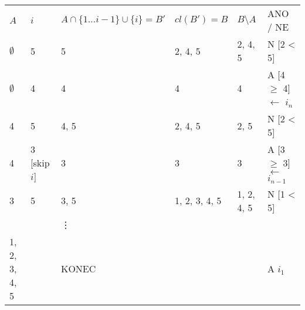 \begin{tabular}{l|l|l|l|l|p{3cm}}
    \multirow{2}{*}{$ A $} & \multirow{2}{*}{$ i $} & \multirow{2}{*}{$ A \cap \{1 \ldots i - 1\} \cup \{i\} = B' $ } & \multirow{2}{*}{$ cl(B') = B $ } & \multirow{2}{*}{$B \setminus A $  } & \multirow{2}{*}{ANO / NE }             \\
                           &                        &                                                                 &                                  &                                     &                                        \\ \hhline
    $\emptyset$            & 5                      & 5                                                               & 2, 4, 5                          & 2, 4, 5                             & N [2 < 5]                              \\
    $\emptyset$            & 4                      & 4                                                               & 4                                & 4                                   & A [4 $\geq$ 4] $\leftarrow$ $i_n$      \\
    4                      & 5                      & 4, 5                                                            & 2, 4, 5                          & 2, 5                                & N [2 < 5]                              \\
    4                      & 3 [skip $i$]           & 3                                                               & 3                                & 3                                   & A [3$\geq$ 3] $\leftarrow$ $i_{n - 1}$ \\
    3                      & 5                      & 3, 5                                                            & 1, 2, 3, 4, 5                    & 1, 2, 4, 5                          & N [1 < 5]                              \\
                           &                        & \vdots                                                          &                                  &                                     &                                        \\
    1, 2, 3, 4, 5          &                        & KONEC                                                           &                                  &                                     & A $i_{1}$
\end{tabular}